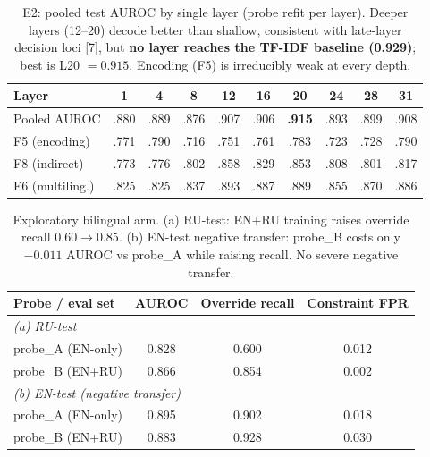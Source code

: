 \begin{table}[t]
\centering
\caption{E2: pooled test AUROC by single layer (probe refit per layer). Deeper
layers (12--20) decode better than shallow, consistent with late-layer decision
loci [7], but \textbf{no layer reaches the TF-IDF baseline (0.929)}; best is
L20 $=0.915$. Encoding (F5) is irreducibly weak at every depth.}
\label{tab:e2}
\begin{tabular}{lccccccccc}
\toprule
Layer & 1 & 4 & 8 & 12 & 16 & 20 & 24 & 28 & 31 \\
\midrule
Pooled AUROC & .880 & .889 & .876 & .907 & .906 & \textbf{.915} & .893 & .899 & .908 \\
F5 (encoding) & .771 & .790 & .716 & .751 & .761 & .783 & .723 & .728 & .790 \\
F8 (indirect) & .773 & .776 & .802 & .858 & .829 & .853 & .808 & .801 & .817 \\
F6 (multiling.) & .825 & .825 & .837 & .893 & .887 & .889 & .855 & .870 & .886 \\
\bottomrule
\end{tabular}
\end{table}

\begin{table}[t]
\centering
\caption{Exploratory bilingual arm. (a) RU-test: EN+RU training raises override
recall $0.60\!\to\!0.85$. (b) EN-test negative transfer: probe\_B costs only
$-0.011$ AUROC vs probe\_A while raising recall. No severe negative transfer.}
\label{tab:bilingual}
\begin{tabular}{lccc}
\toprule
Probe / eval set & AUROC & Override recall & Constraint FPR \\
\midrule
\multicolumn{4}{l}{\emph{(a) RU-test}} \\
probe\_A (EN-only) & 0.828 & 0.600 & 0.012 \\
probe\_B (EN+RU) & 0.866 & 0.854 & 0.002 \\
\midrule
\multicolumn{4}{l}{\emph{(b) EN-test (negative transfer)}} \\
probe\_A (EN-only) & 0.895 & 0.902 & 0.018 \\
probe\_B (EN+RU) & 0.883 & 0.928 & 0.030 \\
\bottomrule
\end{tabular}
\end{table}

